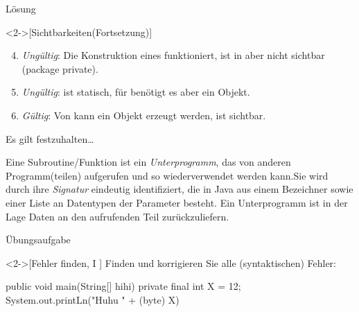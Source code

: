 \begin{frame}[c]{Lösung}
    \addtocounter{solve}{-1}%
    \begin{solve}<2->[Sichtbarkeiten\hfill(Fortsetzung)]
       \begin{enumerate}[<+(1)->]
            \setcounter{enumi}{3}
           \item \emph{Ungültig}: Die Konstruktion eines  funktioniert,  ist in  aber nicht sichtbar (package private).
           \item \emph{Ungültig}:  ist statisch, für  benötigt es aber ein Objekt.
           \item \emph{Gültig}: Von  kann ein Objekt erzeugt werden,  ist  sichtbar.
       \end{enumerate}
    \end{solve}
\end{frame}
\fi

\begin{frame}[c]{Es gilt festzuhalten\ldots}
    \begin{definition}[Subroutinen]
        Eine Subroutine\thinspace /\thinspace Funktion ist ein \emph{Unterprogramm},\pause{} das von anderen Programm(teilen) aufgerufen und so wiederverwendet werden kann.\pause{}\medskip\newline Sie wird durch ihre \emph{Signatur} eindeutig identifiziert,\pause{} die in Java aus einem Bezeichner sowie einer Liste an Datentypen der Parameter besteht. Ein Unterprogramm ist in der Lage Daten an den aufrufenden Teil zurückzuliefern.
    \end{definition}
\end{frame}

\ifull
\begin{frame}[c,fragile]{Übungsaufgabe}
    \begin{exercise}<2->[Fehler finden, I ]
        \pause{}Finden und korrigieren Sie alle (syntaktischen) Fehler:\pause{}
        \begin{plainvoid}
public void main(String[] hihi) {
    private final int X = 12;
    System.out.printLn("Huhu " + (byte) X)
}
        \end{plainvoid}
    \end{exercise}
\end{frame}

